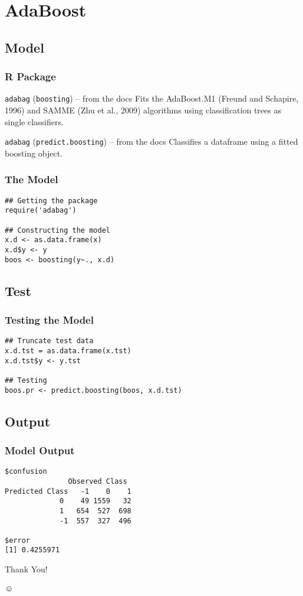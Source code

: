 \documentclass[utf8]{beamer}
\theoremstyle{definition}
\theoremstyle{remark}
\begin{document}
\section{AdaBoost}
\subsection{Model}
\begin{frame}
  \frametitle{R Package}
  \begin{block}{{\tt adabag} ({\tt boosting}) -- from the docs}
    Fits the AdaBoost.M1 (Freund and Schapire, 1996) and SAMME (Zhu et al.,
    2009) algorithms using classification trees as single classifiers.
  \end{block}\pause
  \begin{block}{{\tt adabag} ({\tt predict.boosting}) -- from the docs}
    Classifies a dataframe using a fitted boosting object.
  \end{block}
\end{frame}

\begin{frame}[fragile]
  \frametitle{The Model}
    \begin{lstlisting}
## Getting the package
require('adabag')

## Constructing the model
x.d <- as.data.frame(x)
x.d$y <- y
boos <- boosting(y~., x.d)
    \end{lstlisting}
\end{frame}

\subsection{Test}
\begin{frame}[fragile]
  \frametitle{Testing the Model}
    \begin{lstlisting}
## Truncate test data
x.d.tst = as.data.frame(x.tst)
x.d.tst$y <- y.tst

## Testing
boos.pr <- predict.boosting(boos, x.d.tst)
    \end{lstlisting}
\end{frame}


\subsection{Output}
\begin{frame}[fragile]
  \frametitle{Model Output}
    \begin{lstlisting}
$confusion
               Observed Class
Predicted Class   -1    0    1
             0    49 1559   32
             1   654  527  698
             -1  557  327  496

$error
[1] 0.4255971

    \end{lstlisting}
\end{frame}

\begin{frame}
  \Huge Thank You!\\ \ \\ $\smiley$
\end{frame}
\end{document}
